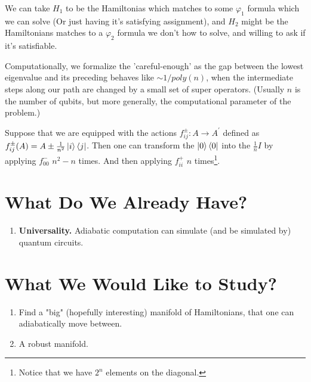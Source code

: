 \documentclass[manuscript,screen,review]{acmart}
\begin{document}
{\begin{example}
\begin{enumerate}
    
     We can take $H_{1}$ to be the Hamiltonias which matches to some $\varphi_1$ formula which we can solve (Or just having it's satisfying assignment), and $H_{2}$ might be the Hamiltonians matches to a $\varphi_2$ formula we don't how to solve, and willing to ask if it's satisfiable. 
    
\end{enumerate}

\end{example}
Computationally, we formalize the 'careful-enough' as the gap between the lowest eigenvalue and its preceding behaves like $\sim 1/poly(n)$, when the intermediate steps along our path are changed by a small set of super operators. (Usually $n$ is the number of qubits, but more generally, the computational parameter of the problem.)  
\begin{example}
    Suppose that we are equipped with the actions $f_{ij}^{\pm} : A \rightarrow A^\prime $ defined as $f_{ij}^\pm (A) = A \pm \frac{1}{n^2}\ket{i}\bra{j}$. Then one can transform the $\ket{0}\bra{0}$ into the $\frac{1}{n}I$ by applying $f^{-}_{00}$ $n^{2} - n$ times. And then applying $f^{+}_{ii}$ $n$ times\footnote{Notice that we have $2^n$ elements on the diagonal.}.
\end{example}
    

\section{What Do We Already Have?}
\begin{enumerate}
    \item \textbf{Universality.} Adiabatic computation can simulate (and be simulated by) quantum circuits.   
\end{enumerate}
\section{What We Would Like to Study?}
\begin{enumerate}
    \item Find a "big" (hopefully interesting) manifold of Hamiltonians, that one can adiabatically move between. 
    \item A robust manifold.   
\end{enumerate}

}
\end{document}
